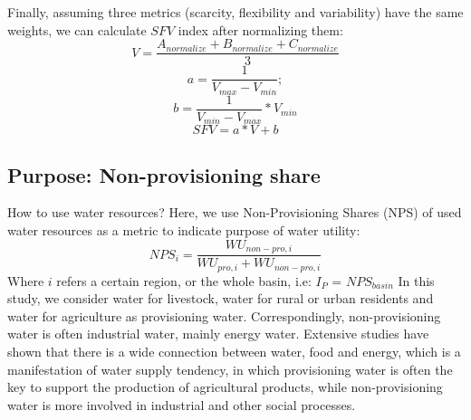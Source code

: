 \documentclass[9pt,twoside,lineno]{pnas-new}
\begin{document}
	Finally, assuming three metrics (scarcity, flexibility and variability) have the same weights, we can calculate $SFV$ index after normalizing them:
	$$ V = \frac{A_{normalize} + B_{normalize} + C_{normalize}}{3} $$
	$$ a = \frac{1}{V_{max} - V_{min}}; $$
	$$ b = \frac{1}{V_{min} - V_{max}} * V_{min} $$
	$$ SFV = a * V + b $$

\subsection*{Purpose: Non-provisioning share}
    How to use water resources?
    Here, we use Non-Provisioning Shares (NPS) of used water resources as a metric to indicate purpose of water utility:
    $$ NPS_{i} = \frac{WU_{non-pro, i}}{WU_{pro, i} + WU_{non-pro, i}} $$
    Where $i$ refers a certain region, or the whole basin, i.e:
	$I_P$ = $NPS_{basin}$
    In this study, we consider water for livestock, water for rural or urban residents and water for agriculture as provisioning water. Correspondingly, non-provisioning water is often industrial water, mainly energy water. Extensive studies have shown that there is a wide connection between water, food and energy, which is a manifestation of water supply tendency, in which provisioning water is often the key to support the production of agricultural products, while non-provisioning water is more involved in industrial and other social processes. %
\end{document}
